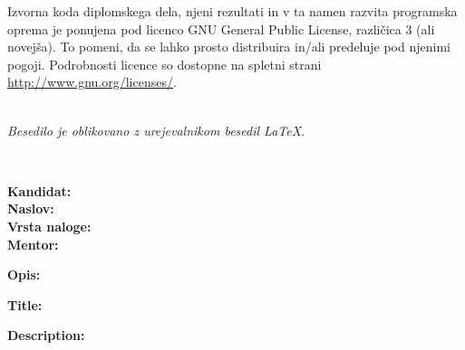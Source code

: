 \vspace*{1cm}
{\small \noindent Izvorna koda diplomskega dela, njeni rezultati in v ta namen razvita programska oprema je ponujena pod licenco GNU General Public License, različica 3 (ali novejša). To pomeni, da se lahko prosto distribuira in/ali predeluje pod njenimi pogoji. Podrobnosti licence so dostopne na spletni strani \url{http://www.gnu.org/licenses/}. }

\vfill
\begin{center}
    \ \\
    \vfill
    {\em Besedilo je oblikovano z urejevalnikom besedil \LaTeX.}
\end{center}

\clearemptydoublepage

\thispagestyle{empty}
\

\vfill

\bigskip
\noindent
\textbf{Kandidat:} \tauthor\\
\noindent
\textbf{Naslov:} \ttitle\\
\noindent
\textbf{Vrsta naloge:} \tvrsta \\
\noindent
\textbf{Mentor:} \tmentor

\bigskip
\noindent
\textbf{Opis:}\\ \tdescription

\bigskip
\noindent
\textbf{Title:} \ttitleEn

\bigskip
\noindent
\textbf{Description:}\\ \tdescriptionEn

\vfill

\vspace{2cm}

\clearemptydoublepage

\thispagestyle{empty}
\mbox{}
\vfill
\null\it%
\noindent
\tzahvala \rm\normalfont

\clearemptydoublepage

\thispagestyle{empty}
\mbox{}{\textheight}\mbox{}\hfill
\begin{minipage}{0.55\textwidth}%
    \tposvetilo \normalfont
\end{minipage}

\clearemptydoublepage

